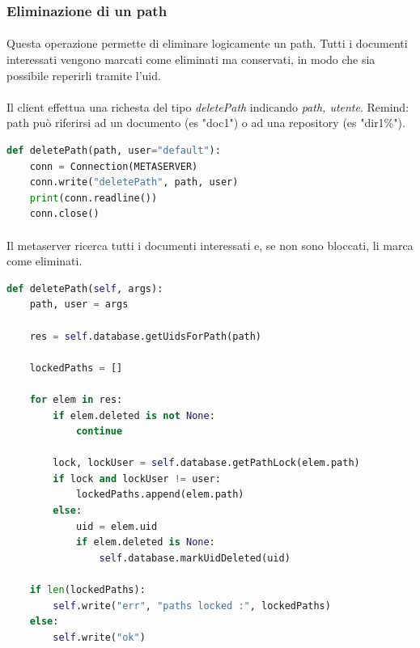 \documentclass[11pt,a4paper,english]{article}
\begin{document}
\subsubsection{Eliminazione di un path}

\paragraph{} Questa operazione permette di eliminare logicamente un path. Tutti i documenti interessati vengono marcati come eliminati ma conservati, in modo che sia possibile reperirli tramite l'uid.

\paragraph{} Il client effettua una richesta del tipo \emph{deletePath} indicando \emph{path, utente}. Remind: path può riferirsi ad un documento (es "doc1") o ad una repository (es "dir1\%"). 

\begin{lstlisting}[language=Python, title=Client]
def deletePath(path, user="default"):
    conn = Connection(METASERVER)
    conn.write("deletePath", path, user)
    print(conn.readline())
    conn.close()
\end{lstlisting}

\paragraph{} Il metaserver ricerca tutti i documenti interessati e, se non sono bloccati, li marca come eliminati. 

\begin{lstlisting}[language=Python, title=Metaserver]
def deletePath(self, args):
    path, user = args

    res = self.database.getUidsForPath(path)

    lockedPaths = []

    for elem in res:
        if elem.deleted is not None:
            continue

        lock, lockUser = self.database.getPathLock(elem.path)
        if lock and lockUser != user:
            lockedPaths.append(elem.path)
        else:
            uid = elem.uid
            if elem.deleted is None:
                self.database.markUidDeleted(uid)

    if len(lockedPaths):
        self.write("err", "paths locked :", lockedPaths)
    else:
        self.write("ok")
\end{lstlisting}
\end{document}
